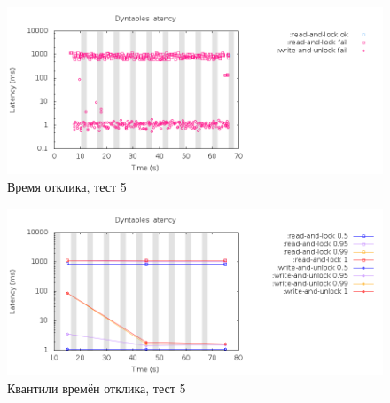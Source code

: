 \documentclass[pdftex,ptm,14pt,a4paper]{extreport}
\theoremstyle{definition}
\begin{document}
\begin{figure}[h]
    \includegraphics[scale=0.6]{dyntables-5/latency-raw.png}
    \caption{Время отклика, тест 5}
\end{figure}

\begin{figure}[h]
    \includegraphics[scale=0.6]{dyntables-5/latency-quantiles.png}
    \caption{Квантили времён отклика, тест 5}
\end{figure}

\printbibliography[title=Список литературы]
\end{document}
